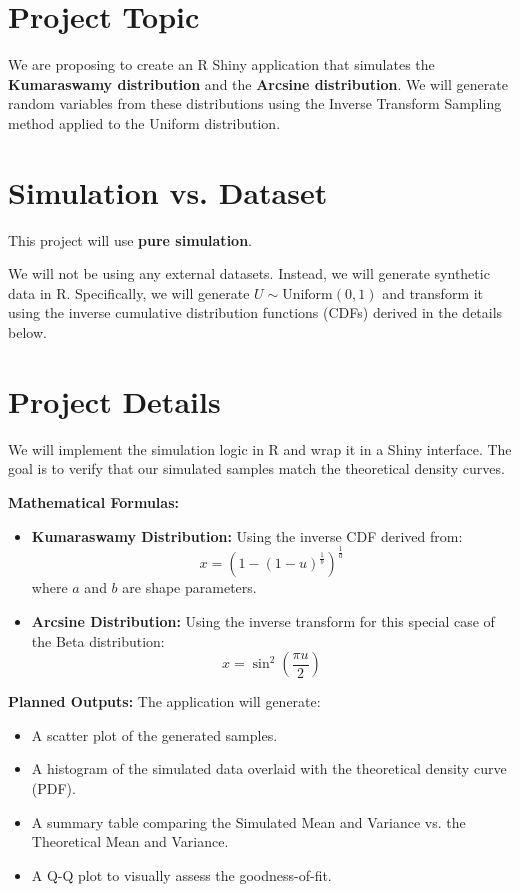 \documentclass{article}
\begin{document}
\begin{normalsize}

\section{Project Topic}
We are proposing to create an R Shiny application that simulates the \textbf{Kumaraswamy distribution} and the \textbf{Arcsine distribution}. We will generate random variables from these distributions using the Inverse Transform Sampling method applied to the Uniform distribution.

\section{Simulation vs. Dataset}
This project will use \textbf{pure simulation}. 

We will not be using any external datasets. Instead, we will generate synthetic data in R. Specifically, we will generate $U \sim \text{Uniform}(0,1)$ and transform it using the inverse cumulative distribution functions (CDFs) derived in the details below.

\section{Project Details}
We will implement the simulation logic in R and wrap it in a Shiny interface. The goal is to verify that our simulated samples match the theoretical density curves.

\noindent \textbf{Mathematical Formulas:}
\begin{itemize}
    \item \textbf{Kumaraswamy Distribution:} Using the inverse CDF derived from:
    $$x = \left( 1 - (1 - u)^{\frac{1}{b}} \right)^{\frac{1}{a}}$$
    where $a$ and $b$ are shape parameters.
    \item \textbf{Arcsine Distribution:} Using the inverse transform for this special case of the Beta distribution:
    $$x = \sin^2\left(\frac{\pi u}{2}\right)$$
\end{itemize}

\noindent \textbf{Planned Outputs:}
The application will generate:
\begin{itemize}
    \item A scatter plot of the generated samples.
    \item A histogram of the simulated data overlaid with the theoretical density curve (PDF).
    \item A summary table comparing the Simulated Mean and Variance vs. the Theoretical Mean and Variance.
    \item A Q-Q plot to visually assess the goodness-of-fit.
\end{itemize}


\end{normalsize}
\end{document}
